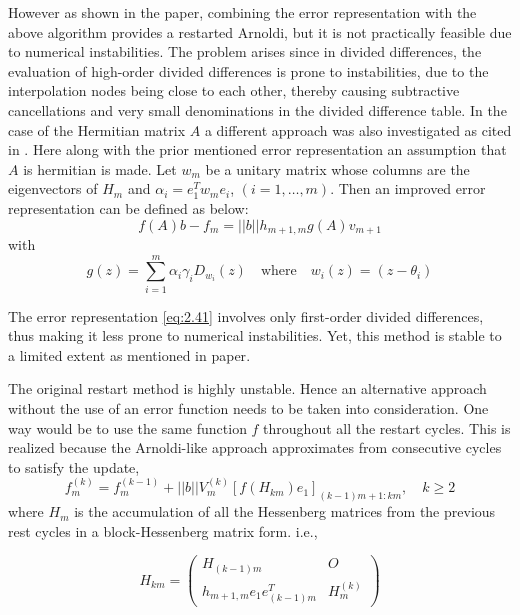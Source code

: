 However as shown in the paper, combining the error representation with the above algorithm provides a restarted Arnoldi, but it is not practically feasible due to numerical instabilities. The problem arises since in divided differences,  the evaluation of high-order divided differences is prone to instabilities, due to the interpolation nodes being close to each other, thereby causing subtractive cancellations and very small denominations in the divided difference table. In the case of the Hermitian matrix $A$ a different approach was also investigated as cited in \cite{5}. Here along with the prior mentioned error representation an assumption that $A$ is hermitian is made. Let $w_{m}$ be a unitary matrix whose columns are the eigenvectors of $H_{m}$ and $\alpha_{i}=e_{1}^{T}w_{m}e_{i}$, $(i=1,\dots,m)$. Then an improved error representation can be defined as below:
\begin{equation}
    f(A)b - f_m = ||b||h_{m+1,m}g(A)v_{m+1}
    \label{eq:2.41}
\end{equation}
with
\begin{equation}
    g(z) = \sum_{i=1}^{m} \alpha_{i} \gamma_{i} D_{w_{i}}(z) \quad \text{where} \quad w_{i}(z) = (z - \theta_{i})
    \label{eq:2.42}
\end{equation}

The error representation \ref{eq:2.41} involves only first-order divided differences, thus making it less prone to numerical instabilities. Yet, this method is stable to a limited extent as mentioned in paper\cite{5}.

The original restart method \cite{44} is highly unstable. Hence an alternative approach without the use of an error function needs to be taken into consideration. One way would be to use the same function $f$ throughout all the restart cycles. This is realized because the Arnoldi-like approach approximates from consecutive cycles to satisfy the update,
\begin{equation}
    f^{(k)}_{m} = f^{(k-1)}_{m} + ||b||V^{(k)}_{m} \left[ f(H_{km})e_{1} \right]_{(k-1)m+1:km}, \quad k \geq 2
    \label{eq:2.43}
\end{equation}
where $H_{m}$ is the accumulation of all the Hessenberg matrices from the previous rest cycles in a block-Hessenberg matrix form. i.e.,

\begin{equation}
    H_{km} =
    \begin{pmatrix}
        H_{(k-1)m} & O \\
        h_{m+1,m} e_1 e_{(k-1)m}^T & H^{(k)}_m
    \end{pmatrix}
    \label{eq:2.44}
\end{equation}

